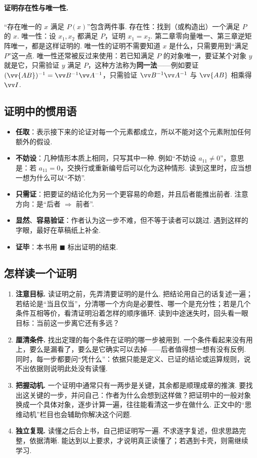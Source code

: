 \paragraph*{证明存在性与唯一性.} “存在唯一的 $x$ 满足 $P(x)$”包含两件事. 存在性：找到（或构造出）一个满足 $P$ 的 $x$. 唯一性：设 $x_1,x_2$ 都满足 $P$，证明 $x_1=x_2$. 第二章零向量唯一、第三章逆矩阵唯一，都是这样证明的. 唯一性的证明不需要知道 $x$ 是什么，只需要用到“满足 $P$”这一点. 唯一性还常被反过来使用：若已知满足 $P$ 的对象唯一，要证某个对象 $y$ 就是它，只需验证 $y$ 满足 $P$，这种方法称为\textbf{同一法}——例如要证 $(\vv{AB})^{-1}=\vv B^{-1}\vv A^{-1}$，只需验证 $\vv B^{-1}\vv A^{-1}$ 与 $\vv{AB}$ 相乘得 $\vv I$.

\subsection{证明中的惯用语}

\begin{itemize}
	\item \textbf{任取}：表示接下来的论证对每一个元素都成立，所以不能对这个元素附加任何额外的假设.
	\item \textbf{不妨设}：几种情形本质上相同，只写其中一种. 例如“不妨设 $a_{11}\ne0$”，意思是：若 $a_{11}=0$，交换行或重新编号后可以化为这种情形. 读到这里时，应当想一想为什么可以“不妨”.
	\item \textbf{只需证}：把要证的结论化为另一个更容易的命题，并且后者能推出前者. 注意方向：是“后者 $\Rightarrow$ 前者”.
	\item \textbf{显然}、\textbf{容易验证}：作者认为这一步不难，但不等于读者可以跳过. 遇到这样的字眼，最好在草稿纸上补全.
	\item \textbf{证毕}：本书用 $\blacksquare$ 标出证明的结束.
\end{itemize}

\subsection{怎样读一个证明}

\begin{enumerate}
	\item \textbf{注意目标.} 读证明之前，先弄清要证明的是什么. 把结论用自己的话复述一遍；若结论是“当且仅当”，分清哪一个方向是必要性、哪一个是充分性；若是几个条件互相等价，看清证明沿着怎样的顺序循环. 读到中途迷失时，回头看一眼目标：当前这一步离它还有多远？
	\item \textbf{厘清条件.} 找出定理的每个条件在证明的哪一步被用到. 一个条件看起来没有用上，要么是漏看了，要么是它确实可以去掉——后者值得想一想有没有反例. 同时，每一步都要问“凭什么”：依据只能是定义、已证的结论或运算规则，说不出依据则说明此处没有读懂.
	\item \textbf{把握动机.} 一个证明中通常只有一两步是关键，其余都是顺理成章的推演. 要找出这关键的一步，并问自己：作者为什么会想到这样做？把证明中的一般对象换成一个具体对象，逐步计算一遍，往往能看清这一步在做什么. 正文中的“思维动机”栏目也会辅助你解决这个问题.
	\item \textbf{独立复现.} 读懂之后合上书，自己把证明写一遍. 不求逐字复述，但求思路完整，依据清晰. 能达到以上要求，才说明真正读懂了；若遇到卡壳，则需继续学习.
\end{enumerate}


